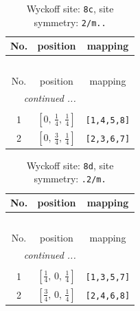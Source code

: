 \documentclass[fleqn,8pt]{jsarticle}
\begin{document}
\begin{longtable}{ccc}
\caption{Wyckoff site: {\tt 8c}, site symmetry: {\tt 2/m..}}
 \\
 \hline \hline
No. & position & mapping \\ \hline \endfirsthead

\multicolumn{2}{l}{\tablename\ \thetable{}} \\
 \hline \hline
No. & position & mapping \\ \hline \endhead

 \hline \hline
\multicolumn{2}{r}{\footnotesize\it continued ...} \\ \endfoot

 \hline \hline
\multicolumn{2}{r}{} \\ \endlastfoot

1 & $\left[ 0,\, \frac{1}{4},\, \frac{1}{4} \right]$ & {\tt [1,4,5,8]} \\ \hline
2 & $\left[ 0,\, \frac{3}{4},\, \frac{1}{4} \right]$ & {\tt [2,3,6,7]} \\
\end{longtable}
\renewcommand{\arraystretch}{1.2}
\begin{longtable}{ccc}
\caption{Wyckoff site: {\tt 8d}, site symmetry: {\tt .2/m.}}
 \\
 \hline \hline
No. & position & mapping \\ \hline \endfirsthead

\multicolumn{2}{l}{\tablename\ \thetable{}} \\
 \hline \hline
No. & position & mapping \\ \hline \endhead

 \hline \hline
\multicolumn{2}{r}{\footnotesize\it continued ...} \\ \endfoot

 \hline \hline
\multicolumn{2}{r}{} \\ \endlastfoot

1 & $\left[ \frac{1}{4},\, 0,\, \frac{1}{4} \right]$ & {\tt [1,3,5,7]} \\ \hline
2 & $\left[ \frac{3}{4},\, 0,\, \frac{1}{4} \right]$ & {\tt [2,4,6,8]} \\
\end{longtable}
\renewcommand{\arraystretch}{1.2}
\end{document}
